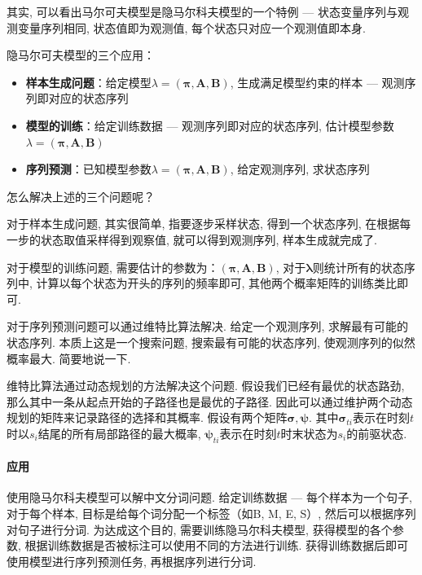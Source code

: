 其实, 可以看出马尔可夫模型是隐马尔科夫模型的一个特例 --- 状态变量序列与观测变量序列相同, 状态值即为观测值, 每个状态只对应一个观测值即本身. 

隐马尔可夫模型的三个应用：
\begin{itemize}
	\item \textbf{样本生成问题}：给定模型$\lambda = (\boldsymbol{\pi}, \boldsymbol{A}, \boldsymbol{B})$, 生成满足模型约束的样本 --- 观测序列即对应的状态序列
	\item \textbf{模型的训练}：给定训练数据 --- 观测序列即对应的状态序列, 估计模型参数$\lambda = (\boldsymbol{\pi}, \boldsymbol{A}, \boldsymbol{B})$
	\item \textbf{序列预测}：已知模型参数$\lambda = (\boldsymbol{\pi}, \boldsymbol{A}, \boldsymbol{B})$, 给定观测序列, 求状态序列
\end{itemize}

怎么解决上述的三个问题呢？

对于样本生成问题, 其实很简单, 指要逐步采样状态, 得到一个状态序列, 在根据每一步的状态取值采样得到观察值, 就可以得到观测序列, 样本生成就完成了. 

对于模型的训练问题, 需要估计的参数为：$(\boldsymbol{\pi}, \boldsymbol{A}, \boldsymbol{B})$, 对于$\boldsymbol{\lambda}$则统计所有的状态序列中, 计算以每个状态为开头的序列的频率即可, 其他两个概率矩阵的训练类比即可. 

对于序列预测问题可以通过维特比算法解决. 给定一个观测序列, 求解最有可能的状态序列. 本质上这是一个搜索问题, 搜索最有可能的状态序列, 使观测序列的似然概率最大. 简要地说一下. 

维特比算法通过动态规划的方法解决这个问题. 假设我们已经有最优的状态路劲, 那么其中一条从起点开始的子路径也是最优的子路径. 因此可以通过维护两个动态规划的矩阵来记录路径的选择和其概率. 假设有两个矩阵$\boldsymbol{\sigma}, \boldsymbol{\psi}$. 其中$\boldsymbol{\sigma}_{ti}$表示在时刻$t$时以$s_i$结尾的所有局部路径的最大概率, $\boldsymbol{\psi}_{ti}$表示在时刻$t$时末状态为$s_i$的前驱状态. 

\paragraph{应用}使用隐马尔科夫模型可以解中文分词问题. 给定训练数据 --- 每个样本为一个句子, 对于每个样本, 目标是给每个词分配一个标签（如{B, M, E, S}）, 然后可以根据序列对句子进行分词. 为达成这个目的, 需要训练隐马尔科夫模型, 获得模型的各个参数, 根据训练数据是否被标注可以使用不同的方法进行训练. 获得训练数据后即可使用模型进行序列预测任务, 再根据序列进行分词. 


